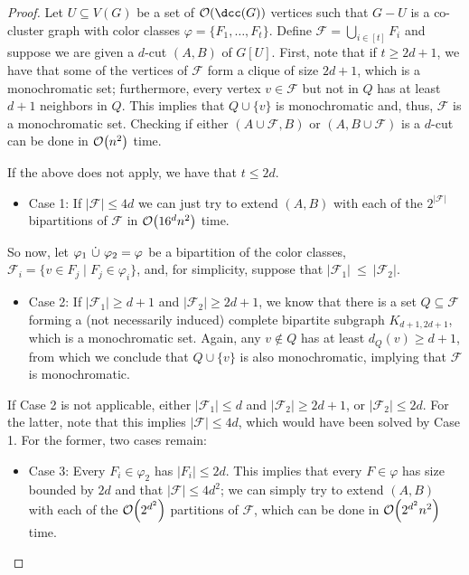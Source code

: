 \begin{proof}
    Let $U \subseteq V(G)$ be a set of $\bigO{\dcc(G)}$ vertices such that $G - U$ is a co-cluster graph with color classes $\varphi = \{F_1, \dots, F_t\}$.
    Define $\mathcal{F} = \bigcup_{i \in [t]} F_i$ and suppose we are given a $d$-cut $(A,B)$ of $G[U]$.
    First, note that if $t \geq 2d+1$, we have that some of the vertices of $\mathcal{F}$ form a clique of size $2d+1$, which is a monochromatic set; furthermore, every vertex $v \in \mathcal{F}$ but not in $Q$ has at least $d+1$ neighbors in $Q$.
    This implies that $Q \cup \{v\}$ is monochromatic and, thus, $\mathcal{F}$ is a monochromatic set.
    Checking if either $(A \cup \mathcal{F}, B)$ or $(A, B \cup \mathcal{F})$ is a $d$-cut can be done in $\mathcal{O}\!\left(n^2\right)$ time.

    If the above does not apply, we have that $t \leq 2d$.
    \begin{itemize}
        \item Case 1: If $|\mathcal{F}| \leq 4d$ we can just try to extend $(A,B)$ with each of the $2^{|\mathcal{F}|}$ bipartitions of $\mathcal{F}$ in $\mathcal{O}\!\left(16^dn^2\right)$ time.
    \end{itemize}

    So now, let $\varphi_1 \ \dot\cup\  \varphi_2 = \varphi$ be a bipartition of the color classes, $\mathcal{F}_i = \{v \in F_j \mid F_j \in \varphi_i\}$, and, for simplicity, suppose that $|\mathcal{F}_1|~\leq~|\mathcal{F}_2|$.

    \begin{itemize}
        \item Case 2: If $|\mathcal{F}_1| \geq d+1$ and $|\mathcal{F}_2| \geq 2d+1$, we know that there is a set $Q \subseteq \mathcal{F}$ forming a (not necessarily induced) complete bipartite subgraph $K_{d+1, 2d+1}$, which is a monochromatic set.
        Again, any $v \notin Q$ has at least $d_Q(v) \geq d+1$, from which we conclude that $Q \cup \{v\}$ is also monochromatic, implying that $\mathcal{F}$ is monochromatic.
    \end{itemize}


    If Case 2 is not applicable, either $|\mathcal{F}_1| \leq d$ and $|\mathcal{F}_2| \geq 2d+1$, or $|\mathcal{F}_2| \leq 2d$.
    For the latter, note that this implies $|\mathcal{F}| \leq 4d$, which would have been solved by Case 1.
    For the former, two cases remain:

    \begin{itemize}
        \item Case 3: Every $F_i \in \varphi_2$ has $|F_i| \leq 2d$. This implies that every $F \in \varphi$ has size bounded by $2d$ and that $|\mathcal{F}| \leq 4d^2$; we can simply try to extend $(A, B)$ with each of the $\mathcal{O}\!\left(2^{d^2}\right)$ partitions of $\mathcal{F}$, which can be done in $\mathcal{O}\!\left(2^{d^2}n^2\right)$ time.


\end{itemize}
\end{proof}
